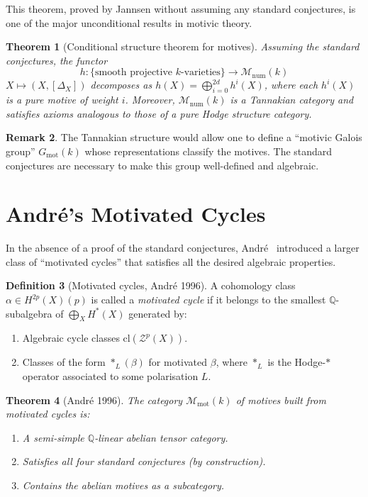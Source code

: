 \documentclass[12pt,a4paper]{amsart}
\newtheorem{theorem}{Theorem}[section]
\theoremstyle{definition}
\newtheorem{definition}[theorem]{Definition}
\newtheorem{remark}[theorem]{Remark}
\newcommand{\Q}{\mathbb{Q}}
\newcommand{\cl}{\mathrm{cl}}
\begin{document}
This theorem, proved by Jannsen without assuming any standard conjectures, is
one of the major unconditional results in motivic theory.

\begin{theorem}[Conditional structure theorem for motives]
Assuming the standard conjectures, the functor
\[
  h: \{\text{smooth projective }k\text{-varieties}\} \to \mathcal{M}_{\mathrm{num}}(k)
\]
$X \mapsto (X, [\Delta_X])$ decomposes as
$h(X) = \bigoplus_{i=0}^{2d} h^i(X)$,
where each $h^i(X)$ is a pure motive of weight $i$.  Moreover,
$\mathcal{M}_{\mathrm{num}}(k)$ is a Tannakian category and satisfies
axioms analogous to those of a pure Hodge structure category.
\end{theorem}

\begin{remark}
The Tannakian structure would allow one to define a ``motivic Galois group''
$G_{\mathrm{mot}}(k)$ whose representations classify the motives.  The standard
conjectures are necessary to make this group well-defined and algebraic.
\end{remark}

\section{Andr\'{e}'s Motivated Cycles}\label{sec:andre}

In the absence of a proof of the standard conjectures, Andr\'e~\cite{andre1996}
introduced a larger class of ``motivated cycles'' that satisfies all the
desired algebraic properties.

\begin{definition}[Motivated cycles, Andr\'{e} 1996]
A cohomology class $\alpha \in H^{2p}(X)(p)$ is called a \emph{motivated
cycle} if it belongs to the smallest $\Q$-subalgebra of $\bigoplus_X H^*(X)$
generated by:
\begin{enumerate}[label=(\roman*)]
  \item Algebraic cycle classes $\cl(\mathcal{Z}^p(X))$.
  \item Classes of the form $*_L(\beta)$ for motivated $\beta$, where $*_L$
        is the Hodge-$*$ operator associated to some polarisation $L$.
\end{enumerate}
\end{definition}

\begin{theorem}[Andr\'{e} 1996]\label{thm:andre}
The category $\mathcal{M}_{\mathrm{mot}}(k)$ of motives built from motivated
cycles is:
\begin{enumerate}[label=(\roman*)]
  \item A semi-simple $\Q$-linear abelian tensor category.
  \item Satisfies all four standard conjectures (by construction).
  \item Contains the abelian motives as a subcategory.
\end{enumerate}
\end{theorem}
\end{document}
